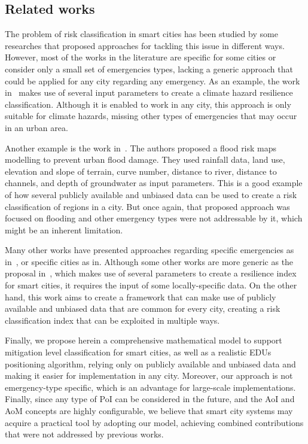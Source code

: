 \begin{refsection}
\section{Related works}\label{sec:works}

The problem of risk classification in smart cities has been studied by some researches that proposed approaches for tackling this issue in different ways. However, most of the works in the literature are specific for some cities or consider only a small set of emergencies types, lacking a generic approach that could be applied for any city regarding any emergency. As an example, the work in~\cite{Hung_2016} makes use of several input parameters to create a climate hazard resilience classification. Although it is enabled to work in any city, this approach is only suitable for climate hazards, missing other types of emergencies that may occur in an urban area.

Another example is the work in~\cite{Darabi_2019}. The authors proposed a flood risk maps modelling to prevent urban flood damage. They used rainfall data, land use, elevation and slope of terrain, curve number, distance to river, distance to channels, and depth of groundwater as input parameters. This is a good example of how several publicly available and unbiased data can be used to create a risk classification of regions in a city. But once again, that proposed approach was focused on flooding and other emergency types were not addressable by it, which might be an inherent limitation.

Many other works have presented approaches regarding specific emergencies as in~\cite{Hondula_2015,Maio_2018}, or specific cities as in\cite{Fernandez_2015}. Although some other works are more generic as the proposal in~\cite{Kontokosta_2018}, which makes use of several parameters to create a resilience index for smart cities, it requires the input of some locally-specific data. On the other hand, this work aims to create a framework that can make use of publicly available and unbiased data that are common for every city, creating a risk classification index that can be exploited in multiple ways.

Finally, we propose herein a comprehensive mathematical model to support mitigation level classification for smart cities, as well as a realistic EDUs positioning algorithm, relying only on publicly available and unbiased data and making it easier for implementation in any city. Moreover, our approach is not emergency-type specific, which is an advantage for large-scale implementations. Finally, since any type of PoI can be considered in the future, and the AoI and AoM concepts are highly configurable, we believe that smart city systems may acquire a practical tool by adopting our model, achieving combined contributions that were not addressed by previous works. 


\end{refsection}
